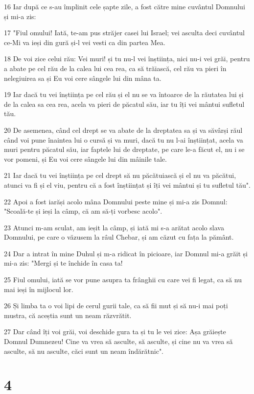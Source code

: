 \par 16 Iar după ce s-au împlinit cele șapte zile, a fost către mine cuvântul Domnului și mi-a zis:
\par 17 "Fiul omului! Iată, te-am pus străjer casei lui Israel; vei asculta deci cuvântul ce-Mi va ieși din gură și-l vei vesti ca din partea Mea.
\par 18 De voi zice celui rău: Vei muri! și tu nu-l vei înștiința, nici nu-i vei grăi, pentru a abate pe cel rău de la calea lui cea rea, ca să trăiască, cel rău va pieri în nelegiuirea sa și Eu voi cere sângele lui din mâna ta.
\par 19 Iar dacă tu vei înștiința pe cel rău și el nu se va întoarce de la răutatea lui și de la calea sa cea rea, acela va pieri de păcatul său, iar tu îți vei mântui sufletul tău.
\par 20 De asemenea, când cel drept se va abate de la dreptatea sa și va săvârși răul când voi pune înaintea lui o cursă și va muri, dacă tu nu l-ai înștiințat, acela va muri pentru păcatul său, iar faptele lui de dreptate, pe care le-a făcut el, nu i se vor pomeni, și Eu voi cere sângele lui din mâinile tale.
\par 21 Iar dacă tu vei înștiința pe cel drept să nu păcătuiască și el nu va păcătui, atunci va fi și el viu, pentru că a fost înștiințat și îți vei mântui și tu sufletul tău".
\par 22 Apoi a fost iarăși acolo mâna Domnului peste mine și mi-a zis Domnul: "Scoală-te și ieși la câmp, că am să-ți vorbesc acolo".
\par 23 Atunci m-am sculat, am ieșit la câmp, și iată mi s-a arătat acolo slava Domnului, pe care o văzusem la râul Chebar, și am căzut cu fața la pământ.
\par 24 Dar a intrat în mine Duhul și m-a ridicat în picioare, iar Domnul mi-a grăit și mi-a zis: "Mergi și te închide în casa ta!
\par 25 Fiul omului, iată se vor pune asupra ta frânghii cu care vei fi legat, ca să nu mai ieși în mijlocul lor.
\par 26 Și limba ta o voi lipi de cerul gurii tale, ca să fii mut și să nu-i mai poți mustra, că aceștia sunt un neam răzvrătit.
\par 27 Dar când îți voi grăi, voi deschide gura ta și tu le vei zice: Așa grăiește Domnul Dumnezeu! Cine va vrea să asculte, să asculte, și cine nu va vrea să asculte, să nu asculte, căci sunt un neam îndărătnic".

\chapter{4}

